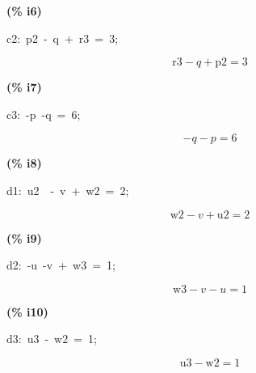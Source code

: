 \documentclass[fleqn]{article}
\begin{document}
\noindent
\begin{minipage}[t]{4.000000em}\color{red}\bfseries
(\% i6)	
\end{minipage}
\begin{minipage}[t]{\textwidth}\color{blue}
c2:\ p2\ -\ q\ +\ r3\ =\ 3;
\end{minipage}
\[\displaystyle \tag{c2} 
\ensuremath{\mathrm{r3}}\mathop{-}q\mathop{+}\ensuremath{\mathrm{p2}}\mathop{=}3\mbox{}
\]


\noindent
\begin{minipage}[t]{4.000000em}\color{red}\bfseries
(\% i7)	
\end{minipage}
\begin{minipage}[t]{\textwidth}\color{blue}
c3:\ -p\ -q\ =\ 6;
\end{minipage}
\[\displaystyle \tag{c3} 
\mathop{-}q\mathop{-}p\mathop{=}6\mbox{}
\]


\noindent
\begin{minipage}[t]{4.000000em}\color{red}\bfseries
(\% i8)	
\end{minipage}
\begin{minipage}[t]{\textwidth}\color{blue}
d1:\ u2\ \ -\ v\ +\ w2\ =\ 2;
\end{minipage}
\[\displaystyle \tag{d1} 
\ensuremath{\mathrm{w2}}\mathop{-}v\mathop{+}\ensuremath{\mathrm{u2}}\mathop{=}2\mbox{}
\]


\noindent
\begin{minipage}[t]{4.000000em}\color{red}\bfseries
(\% i9)	
\end{minipage}
\begin{minipage}[t]{\textwidth}\color{blue}
d2:\ -u\ -v\ +\ w3\ =\ 1;
\end{minipage}
\[\displaystyle \tag{d2} 
\ensuremath{\mathrm{w3}}\mathop{-}v\mathop{-}u\mathop{=}1\mbox{}
\]


\noindent
\begin{minipage}[t]{4.000000em}\color{red}\bfseries
(\% i10)	
\end{minipage}
\begin{minipage}[t]{\textwidth}\color{blue}
d3:\ u3\ -\ w2\ =\ 1;
\end{minipage}
\[\displaystyle \tag{d3} 
\ensuremath{\mathrm{u3}}\mathop{-}\ensuremath{\mathrm{w2}}\mathop{=}1\mbox{}
\]
\end{document}
